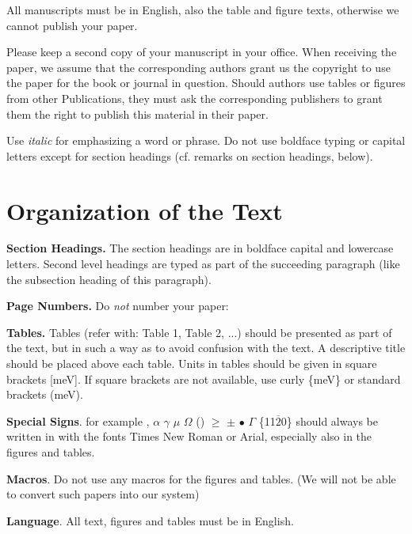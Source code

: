 \documentclass{TTP}
\begin{document}
All manuscripts must be in English, also the table and figure texts, otherwise we cannot publish your paper.

Please keep a second copy of your manuscript in your office. When receiving the paper, we assume 
that the corresponding authors grant us the copyright to use the paper for the book or journal in question.
Should authors use tables or figures from other Publications, they must ask the corresponding publishers to 
grant them the right to publish this material in their paper.

Use \textit{italic} for emphasizing a word or phrase. 
Do not use boldface typing or capital letters except for section headings (cf. remarks on section headings, below). 

\section{Organization of the Text}

\noindent \textbf{Section Headings.} The section headings are in boldface capital and lowercase letters. 
Second level headings are typed as part of the succeeding paragraph (like the subsection heading of this paragraph).

\textbf{Page Numbers.} Do \textit{not} number your paper: 

\textbf{Tables.} Tables (refer with: Table 1, Table 2, ...) should be presented as part of the text, but in such a 
way as to avoid confusion with the text. A descriptive title should be placed above each table. Units in tables should
 be given in square brackets [meV]. If square brackets are not available, use curly \{meV\} or standard brackets (meV). 

\textbf{Special Signs}. for example , $\alpha$ $\gamma$  $\mu$ $\Omega$ () $\ge$  $\pm$ $\bullet$  $\Gamma$ \{11$\overline{2}$0\} should always be written in with the 
fonts Times New Roman or Arial, especially also in the figures and tables.

\textbf{Macros}. Do not use any macros for the figures and tables. (We will not be able to convert such papers into our system)
\newpage

\textbf{Language}. All text, figures and tables must be in English.
\end{document}
